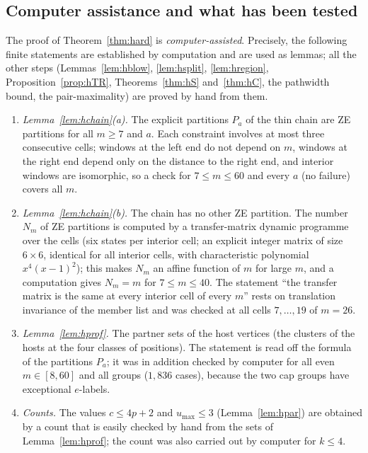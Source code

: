 \subsection{Computer assistance and what has been tested}\label{sec:hardcomp}
The proof of Theorem~\ref{thm:hard} is \emph{computer-assisted}. Precisely, the following finite statements are established by computation and are used as lemmas; all the other steps (Lemmas~\ref{lem:hblow}, \ref{lem:hsplit}, \ref{lem:hregion}, Proposition~\ref{prop:hTR}, Theorems~\ref{thm:hS} and~\ref{thm:hC}, the pathwidth bound, the pair-maximality) are proved by hand from them.
\begin{enumerate}
\item[(CA1)] \emph{Lemma~\ref{lem:hchain}(a).} The explicit partitions $P_a$ of the thin chain are ZE partitions for all $m\ge7$ and $a$. Each constraint involves at most three consecutive cells; windows at the left end do not depend on $m$, windows at the right end depend only on the distance to the right end, and interior windows are isomorphic, so a check for $7\le m\le60$ and every $a$ (no failure) covers all $m$.
\item[(CA2)] \emph{Lemma~\ref{lem:hchain}(b).} The chain has no other ZE partition. The number $N_m$ of ZE partitions is computed by a transfer-matrix dynamic programme over the cells (six states per interior cell; an explicit integer matrix of size $6\times6$, identical for all interior cells, with characteristic polynomial $x^4(x-1)^2$); this makes $N_m$ an affine function of $m$ for large $m$, and a computation gives $N_m=m$ for $7\le m\le40$. The statement ``the transfer matrix is the same at every interior cell of every $m$'' rests on translation invariance of the member list and was checked at all cells $7,\dots,19$ of $m=26$.
\item[(CA3)] \emph{Lemma~\ref{lem:hprof}.} The partner sets of the host vertices (the clusters of the hosts at the four classes of positions). The statement is read off the formula of the partitions $P_a$; it was in addition checked by computer for all even $m\in[8,60]$ and all groups ($1{,}836$ cases), because the two cap groups have exceptional $e$-labels.
\item[(CA4)] \emph{Counts.} The values $c\le4p+2$ and $u_{\max}\le3$ (Lemma~\ref{lem:hpar}) are obtained by a count that is easily checked by hand from the sets of Lemma~\ref{lem:hprof}; the count was also carried out by computer for $k\le4$.
\end{enumerate}
